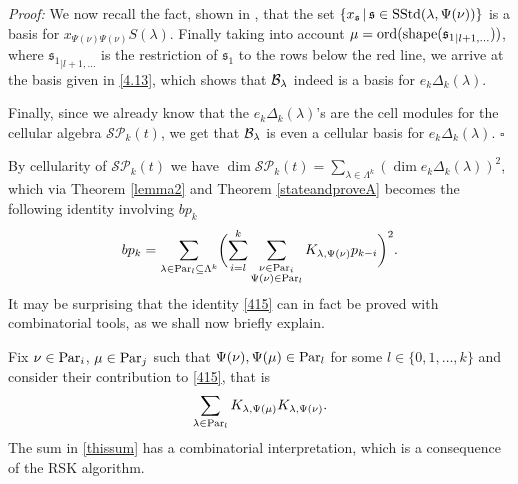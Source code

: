 \documentclass[10pt,hidelinks]{article}
\newcommand{\ord}{{\rm{ord}}}
\newcommand{\shape}{\text{shape}}
\newcommand{\SpheAlg}{{\mathcal{SP} }_{k}}
\newcommand{\Par}{{\rm Par}   }
\newcommand{\s}{\mathfrak{s}}
\newcommand{\sstd}{{\rm SStd}}
\newenvironment{dem}{\noindent \textit{Proof:} }{\quad \hfill $\square$}
\numberwithin{equation}{section}
\begin{document}
\begin{dem}
\medskip
We now recall the fact, shown in
\cite{Murphy}, that 
the set $ \{ x_{\s} \, | \, \s \in \sstd(\lambda,  \Psi(\nu)) \} $ is 
a basis for $ x_{ \Psi(\nu)  \Psi(\nu)} S(\lambda) $. Finally taking into account $ \mu =
\ord( \shape({\s_1}_{|l+1, \ldots })) $, where
$ {\s_1}_{|l+1, \ldots } $ is the restriction of $ \s_1 $ to the rows below the red line,
we arrive at the basis given in \eqref{4.13}, which shows that $ {\cal B}_{\lambda}$ indeed is a basis for $e_k \Delta_k(\lambda) $. 

\medskip
Finally, since we already know that the $ e_k \Delta_k(\lambda) $'s are the cell modules for the cellular algebra
$ \SpheAlg(t) $, we get that $ {\cal B}_{\lambda} $ is even a cellular basis for $e_k \Delta_k(\lambda) $. 
{\color{black}{This concludes our proof.}}
\end{dem}



\medskip
\medskip

By cellularity of $\SpheAlg(t) $ we have 
$ \dim  \SpheAlg(t) = \sum_{ \lambda \in \Lambda^k } (\dim e_k  \Delta_k(\lambda) )^2 $, which 
via Theorem \ref{lemma2} and Theorem \ref{stateandproveA} becomes the following 
identity involving $ bp_k $
\begin{equation}\label{415}
  bp_k = \sum_{ \lambda \in \Par_l \subseteq \Lambda^k }\biggl (   \sum_{i=l}^k \sum_{\substack{  \nu \in \Par_i  \\  \Psi(\nu) \in \Par_l }} K_{\lambda,  \Psi(\nu)} p_{{k-i}}
  \biggr)^2. 
\end{equation}
It may be surprising that the identity \eqref{415} can in fact be proved 
with combinatorial tools, as we shall now briefly explain.


\medskip
Fix $\nu \in \Par_i $, $  \mu \in \Par_j $ such that $ \Psi(\nu),  \Psi(\mu) \in \Par_l  $ for
some $ l \in \{0, 1, \ldots, k \} $ 
and consider their contribution to \eqref{415}, that is 
\begin{equation}\label{thissum}
   \sum_{ \lambda \in \Par_l  } K_{\lambda,  \Psi(\mu)} K_{\lambda,  \Psi(\nu)}. 
\end{equation}
The sum in \eqref{thissum} has a
combinatorial interpretation, which is a consequence of the RSK algorithm.
\end{document}
